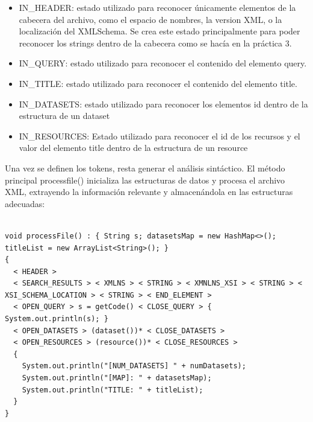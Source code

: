 \begin{itemize}
    \item IN\_HEADER: estado utilizado para reconocer únicamente elementos de la cabecera del archivo, como el espacio de nombres, la version XML, o la localización del XMLSchema. Se crea este estado principalmente para poder reconocer los strings dentro de la cabecera como se hacía en la práctica 3.
    \item IN\_QUERY: estado utilizado para reconocer el contenido del elemento query.
    \item IN\_TITLE: estado utilizado para reconocer el contenido del elemento title.
    \item IN\_DATASETS: estado utilizado para reconocer los elementos id dentro de la estructura de un dataset
    \item IN\_RESOURCES: Estado utilizado para reconocer el id de los recursos y el valor del elemento title dentro de la estructura de un resource
\end{itemize}


Una vez se definen los tokens, resta generar el análisis sintáctico. El método principal processfile() inicializa las estructuras de datos y procesa el archivo XML, extrayendo la información relevante y almacenándola en las estructuras adecuadas:

\lstset{inputencoding=utf8/latin1}
\begin{lstlisting}

void processFile() : { String s; datasetsMap = new HashMap<>(); titleList = new ArrayList<String>(); }
{
  < HEADER > 
  < SEARCH_RESULTS > < XMLNS > < STRING > < XMNLNS_XSI > < STRING > < XSI_SCHEMA_LOCATION > < STRING > < END_ELEMENT > 
  < OPEN_QUERY > s = getCode() < CLOSE_QUERY > { System.out.println(s); }
  < OPEN_DATASETS > (dataset())* < CLOSE_DATASETS >
  < OPEN_RESOURCES > (resource())* < CLOSE_RESOURCES >
  {
    System.out.println("[NUM_DATASETS] " + numDatasets);
    System.out.println("[MAP]: " + datasetsMap);
    System.out.println("TITLE: " + titleList);
  }
}

\end{lstlisting}

